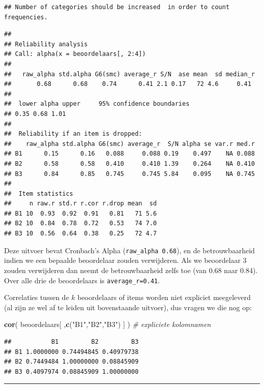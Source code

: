 \documentclass[
]{book}
\newenvironment{Shaded}{\begin{snugshade}}{\end{snugshade}}
\newcommand{\CommentTok}[1]{\textcolor[rgb]{0.56,0.35,0.01}{\textit{#1}}}
\newcommand{\KeywordTok}[1]{\textcolor[rgb]{0.13,0.29,0.53}{\textbf{#1}}}
\newcommand{\NormalTok}[1]{#1}
\newcommand{\StringTok}[1]{\textcolor[rgb]{0.31,0.60,0.02}{#1}}
\begin{document}
\begin{verbatim}
## Number of categories should be increased  in order to count frequencies.
\end{verbatim}

\begin{verbatim}
## 
## Reliability analysis   
## Call: alpha(x = beoordelaars[, 2:4])
## 
##   raw_alpha std.alpha G6(smc) average_r S/N  ase mean  sd median_r
##       0.68      0.68    0.74      0.41 2.1 0.17   72 4.6     0.41
## 
##  lower alpha upper     95% confidence boundaries
## 0.35 0.68 1.01 
## 
##  Reliability if an item is dropped:
##    raw_alpha std.alpha G6(smc) average_r  S/N alpha se var.r med.r
## B1      0.15      0.16   0.088     0.088 0.19    0.497    NA 0.088
## B2      0.58      0.58   0.410     0.410 1.39    0.264    NA 0.410
## B3      0.84      0.85   0.745     0.745 5.84    0.095    NA 0.745
## 
##  Item statistics 
##     n raw.r std.r r.cor r.drop mean  sd
## B1 10  0.93  0.92  0.91   0.81   71 5.6
## B2 10  0.84  0.78  0.72   0.53   74 7.0
## B3 10  0.56  0.64  0.38   0.25   72 4.7
\end{verbatim}

Deze uitvoer bevat Cronbach's Alpha (\texttt{raw\_alpha\ 0.68}), en de
betrouwbaarheid indien we een bepaalde beoordelaar zouden verwijderen.
Als we beoordelaar 3 zouden verwijderen dan neemt de betrouwbaarheid
zelfs toe (van 0.68 naar 0.84). Over alle drie de beoordelaars is
\texttt{average\_r=0.41}.

Correlaties tussen de \(k\) beoordelaars of items worden niet expliciet
meegeleverd (al zijn ze wel af te leiden uit bovenstaande uitvoer), dus
vragen we die nog op:

\begin{Shaded}
\begin{Highlighting}[]
\KeywordTok{cor}\NormalTok{( beoordelaars[ ,}\KeywordTok{c}\NormalTok{(}\StringTok{"B1"}\NormalTok{,}\StringTok{"B2"}\NormalTok{,}\StringTok{"B3"}\NormalTok{) ] ) }\CommentTok{\# expliciete kolomnamen}
\end{Highlighting}
\end{Shaded}

\begin{verbatim}
##           B1         B2         B3
## B1 1.0000000 0.74494845 0.40979738
## B2 0.7449484 1.00000000 0.08845909
## B3 0.4097974 0.08845909 1.00000000
\end{verbatim}

\begin{center}\rule{0.5\linewidth}{0.5pt}\end{center}
\end{document}
